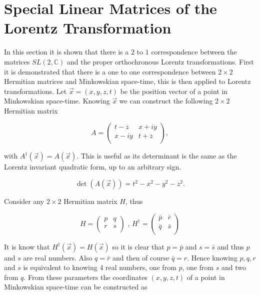 \section{Special Linear Matrices of the Lorentz Transformation}\label{Special_Linear_Matrices_of_Lorentz}

In this section it is shown that there is a $2$ to $1$ correspondence between the matrices $SL(2, \mathbb{C})$ and the proper orthochronous Lorentz transformations. First it is demonstrated that there is a one to one correspondence between $2 \times 2$ Hermitian matrices and Minkowskian space-time, this is then applied to Lorentz transformations. Let $\vec{x} = (x,y,z,t)$ be the position vector of a point in Minkowskian space-time. Knowing $\vec{x}$ we can construct the following $2 \times 2$ Hermitian matrix

\begin{equation}\label{Special_Matrices_A_first}
A = 
\left( 
\begin{array}{cc}
t-z    & x + i y \\
x - iy & t+z \\
\end{array} 
\right),
\end{equation}

\noindent with $A^{\dagger}(\vec{x}) = A(\vec{x})$. This is useful as its determinant is the same as the Lorentz invariant quadratic form, up to an arbitrary sign.

\begin{equation*}
\det(A(\vec{x})) = t^2 - x^2 - y^2 - z^2.
\end{equation*}

Consider any $2 \times 2$ Hermitian matrix $H$, thus

\begin{equation*}
H = \left( \begin{array}{cc}
p & q \\
r & s \\
\end{array} \right) \text{ ,     }
H^{\dagger} = \left( \begin{array}{cc}
\bar{p} & \bar{r} \\
\bar{q} & \bar{s} \\
\end{array} \right)
\end{equation*}

\noindent It is know that $H^{\dagger}(\vec{x}) = H(\vec{x})$ so it is clear that $p = \bar{p}$ and $s = \bar{s}$ and thus $p$ and $s$ are real numbers. Also $q = \bar{r}$ and then of course $\bar{q} = r$. Hence knowing $p,q,r$ and $s$ is equivalent to knowing $4$ real numbers, one from $p$, one from $s$ and two from $q$. From these parameters the coordinates $(x,y,z,t)$ of a point in Minkowskian space-time can be constructed as

